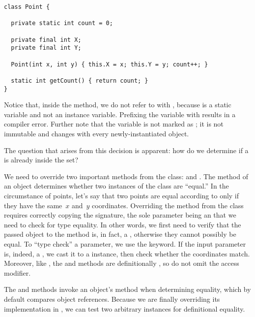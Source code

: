 \begin{lstlisting}[language=MyJava]
class Point {

  private static int count = 0;

  private final int X;
  private final int Y;

  Point(int x, int y) { this.X = x; this.Y = y; count++; }

  static int getCount() { return count; }
}
\end{lstlisting}

Notice that, inside the  method, we do not refer to  with , because  is a static variable and not an instance variable. 
Prefixing the  variable with  results in a compiler error. 
Further note that the variable is not marked as ; it is not immutable and changes with every newly-instantiated  object.

The question that arises from this decision is apparent: how do we determine if a  is already inside the set? 

We need to override two important methods from the  class:  and . 
The  method of an object determines whether two instances of the class are ``equal.'' 
In the circumstance of points, let's say that two points are equal according to  only if they have the same~$x$ and~$y$ coordinates. 
Overriding the  method from the  class requires correctly copying the signature, the sole parameter being an  that we need to check for type equality. 
In other words, we first need to verify that the passed object to the  method is, in fact, a , otherwise they cannot possibly be equal. 
To ``type check'' a parameter, we use the  keyword. 
If the input parameter is, indeed, a , we cast it to a  instance, then check whether the coordinates match. 
Moreover, like , the  and  methods are definitionally , so do not omit the access modifier.

The  and  methods invoke an object's  method when determining equality, which by default compares object references. 
Because we are finally overriding its implementation in , we can test two arbitrary  instances for definitional equality.

